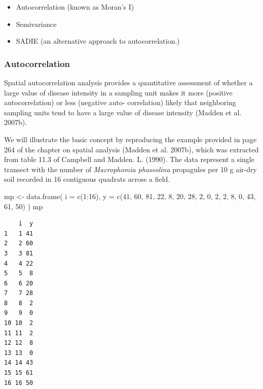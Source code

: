 \documentclass[
  letterpaper,
]{book}
\newenvironment{Shaded}{\begin{snugshade}}{\end{snugshade}}
\newcommand{\AttributeTok}[1]{\textcolor[rgb]{0.40,0.45,0.13}{#1}}
\newcommand{\DecValTok}[1]{\textcolor[rgb]{0.68,0.00,0.00}{#1}}
\newcommand{\FunctionTok}[1]{\textcolor[rgb]{0.28,0.35,0.67}{#1}}
\newcommand{\NormalTok}[1]{\textcolor[rgb]{0.00,0.23,0.31}{#1}}
\newcommand{\OtherTok}[1]{\textcolor[rgb]{0.00,0.23,0.31}{#1}}
\newcommand{\SpecialCharTok}[1]{\textcolor[rgb]{0.37,0.37,0.37}{#1}}
\begin{document}
\begin{itemize}
\item
  Autocorrelation (known as Moran's I)
\item
  Semivariance
\item
  SADIE (an alternative approach to autocorrelation.)
\end{itemize}

\hypertarget{autocorrelation}{%
\subsubsection{Autocorrelation}\label{autocorrelation}}

Spatial autocorrelation analysis provides a quantitative assessment of
whether a large value of disease intensity in a sampling unit makes it
more (positive autocorrelation) or less (negative auto- correlation)
likely that neighboring sampling units tend to have a large value of
disease intensity (Madden et al. 2007b).

We will illustrate the basic concept by reproducing the example provided
in page 264 of the chapter on spatial analysis (Madden et al. 2007b),
which was extracted from table 11.3 of Campbell and Madden. L. (1990).
The data represent a single transect with the number of
\emph{Macrophomia phaseolina} propagules per 10 g air-dry soil recorded
in 16 contiguous quadrats across a field.

\begin{Shaded}
\begin{Highlighting}[]
\NormalTok{mp }\OtherTok{\textless{}{-}} \FunctionTok{data.frame}\NormalTok{(}
  \AttributeTok{i =} \FunctionTok{c}\NormalTok{(}\DecValTok{1}\SpecialCharTok{:}\DecValTok{16}\NormalTok{),}
  \AttributeTok{y =} \FunctionTok{c}\NormalTok{(}\DecValTok{41}\NormalTok{, }\DecValTok{60}\NormalTok{, }\DecValTok{81}\NormalTok{, }\DecValTok{22}\NormalTok{, }\DecValTok{8}\NormalTok{, }\DecValTok{20}\NormalTok{, }\DecValTok{28}\NormalTok{, }\DecValTok{2}\NormalTok{, }\DecValTok{0}\NormalTok{, }\DecValTok{2}\NormalTok{, }\DecValTok{2}\NormalTok{, }\DecValTok{8}\NormalTok{, }\DecValTok{0}\NormalTok{, }\DecValTok{43}\NormalTok{, }\DecValTok{61}\NormalTok{, }\DecValTok{50}\NormalTok{)}
\NormalTok{)}
\NormalTok{mp}
\end{Highlighting}
\end{Shaded}

\begin{verbatim}
    i  y
1   1 41
2   2 60
3   3 81
4   4 22
5   5  8
6   6 20
7   7 28
8   8  2
9   9  0
10 10  2
11 11  2
12 12  8
13 13  0
14 14 43
15 15 61
16 16 50
\end{verbatim}
\end{document}
